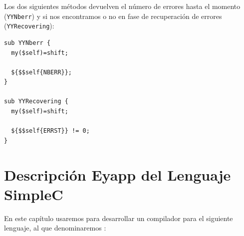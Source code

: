Los dos siguientes métodos devuelven el número de errores hasta el momento
(\verb|YYNberr|)
y si nos encontramos o no en fase de recuperación de errores (\verb|YYRecovering|):
\begin{verbatim}
sub YYNberr {
  my($self)=shift;

  ${$$self{NBERR}};
}

sub YYRecovering {
  my($self)=shift;

  ${$$self{ERRST}} != 0;
}
\end{verbatim}

\section{Descripción Eyapp del Lenguaje  SimpleC}
\label{section:simplec}
En este capítulo usaremos  para desarrollar
un compilador para el siguiente lenguaje, al que denominaremos :

